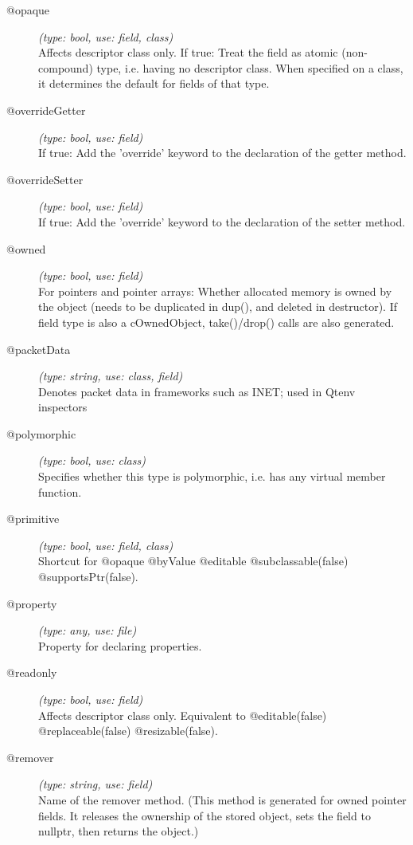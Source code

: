\begin{description}
\item[@opaque] \textit{(type: bool, use: field, class)} \\
  Affects descriptor class only. If true: Treat the field as atomic
  (non-compound) type, i.e. having no descriptor class. When specified on a
  class, it determines the default for fields of that type.

\item[@overrideGetter] \textit{(type: bool, use: field)} \\
  If true: Add the 'override' keyword to the declaration of the getter method.

\item[@overrideSetter] \textit{(type: bool, use: field)} \\
  If true: Add the 'override' keyword to the declaration of the setter method.

\item[@owned] \textit{(type: bool, use: field)} \\
  For pointers and pointer arrays: Whether allocated memory is owned by the
  object (needs to be duplicated in dup(), and deleted in destructor). If
  field type is also a cOwnedObject, take()/drop() calls are also generated.

\item[@packetData] \textit{(type: string, use: class, field)} \\
  Denotes packet data in frameworks such as INET; used in Qtenv inspectors

\item[@polymorphic] \textit{(type: bool, use: class)} \\
  Specifies whether this type is polymorphic, i.e. has any virtual member
  function.

\item[@primitive] \textit{(type: bool, use: field, class)} \\
  Shortcut for @opaque @byValue @editable @subclassable(false)
  @supportsPtr(false).

\item[@property] \textit{(type: any, use: file)} \\
  Property for declaring properties.

\item[@readonly] \textit{(type: bool, use: field)} \\
  Affects descriptor class only. Equivalent to @editable(false)
  @replaceable(false) @resizable(false).

\item[@remover] \textit{(type: string, use: field)} \\
  Name of the remover method. (This method is generated for owned pointer
  fields. It releases the ownership of the stored object, sets the field to
  nullptr, then returns the object.)


\end{description}
